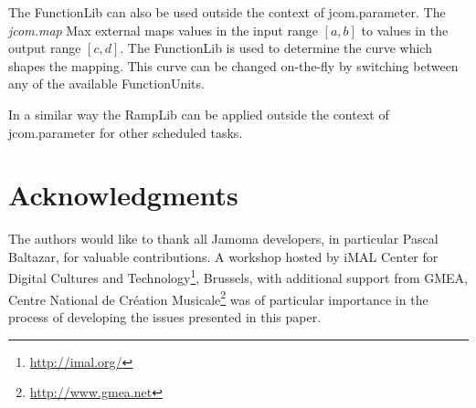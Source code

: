 \documentclass{article}
\begin{document}
The FunctionLib can also be used outside the context of jcom.parameter. The \emph{jcom.map} Max external maps values in the input range $[a,b]$ to values in the output range $[c,d]$. The FunctionLib is used to determine the curve which shapes the mapping. This curve can be changed on-the-fly by switching between any of the available FunctionUnits. %

In a similar way the RampLib can be applied outside the context of jcom.parameter for other scheduled tasks.


\section{Acknowledgments} %

The authors would like to thank all Jamoma developers, in particular Pascal Baltazar, for valuable contributions. A workshop hosted by iMAL Center for Digital Cultures and Technology\footnote{\url{http://imal.org/}}, Brussels, with additional support from GMEA, Centre National de Cr\'eation Musicale\footnote{\url{http://www.gmea.net}} was of particular importance in the process of developing the issues presented in this paper.


\end{document}
